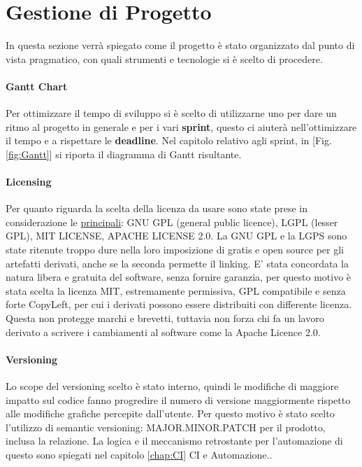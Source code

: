     
    
    

\section{Gestione di Progetto}
In questa sezione verrà spiegato come il progetto è stato organizzato dal punto di vista pragmatico, con quali strumenti e tecnologie si è scelto di procedere.
    \paragraph{Gantt Chart} Per ottimizzare il tempo di sviluppo si è scelto di utilizzarne uno per dare un ritmo al progetto in generale e per i vari \textbf{sprint}, questo ci aiuterà nell'ottimizzare il tempo e a rispettare le \textbf{deadline}. Nel capitolo relativo agli sprint, in [Fig. \ref{fig:Gantt}]  si riporta il diagramma di Gantt risultante. 
    
    \paragraph{Licensing} Per quanto riguarda la scelta della licenza da usare sono state prese in considerazione le \href{https://choosealicense.com/licenses/}{principali}: GNU GPL (general public licence), LGPL (lesser GPL), MIT LICENSE, APACHE LICENSE 2.0. La GNU GPL e la LGPS sono state ritenute troppo dure nella loro imposizione di gratis e open source per gli artefatti derivati, anche se la seconda permette il linking. E' stata concordata la natura libera e gratuita del software, senza fornire garanzia, per questo motivo è stata scelta la licenza MIT, estremamente permissiva, GPL compatibile e senza forte CopyLeft, per cui i derivati possono essere distribuiti con differente licenza. Questa non protegge marchi e brevetti, tuttavia non forza chi fa un lavoro derivato a scrivere i cambiamenti al software come la Apache Licence 2.0.
    
    \paragraph{Versioning}
    Lo scope del versioning scelto è stato interno, quindi le modifiche di maggiore impatto sul codice fanno progredire il numero di versione maggiormente rispetto alle modifiche grafiche percepite dall'utente. Per questo motivo è stato scelto l'utilizzo di semantic versioning: MAJOR.MINOR.PATCH per il prodotto, inclusa la relazione. La logica e il meccanismo retrostante per l'automazione di questo sono spiegati nel capitolo \ref{chap:CI} CI e Automazione..
    

